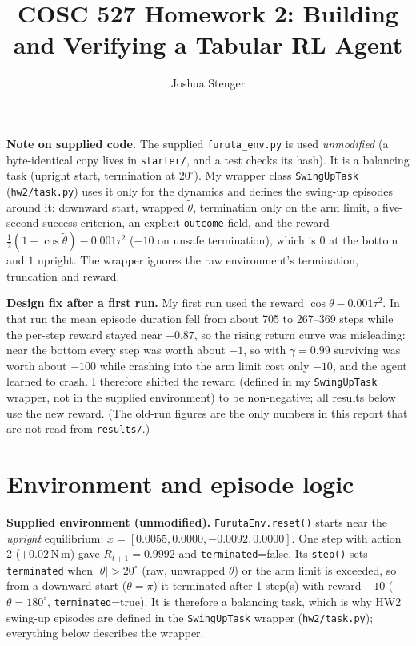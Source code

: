 \documentclass[11pt]{article}
\title{COSC 527 Homework 2: Building and Verifying a Tabular RL Agent}
\author{Joshua Stenger}
\date{}
\newcommand{\cfggamma}{0.99}
\newcommand{\rawinit}{[0.0055, 0.0000, -0.0092, 0.0000]}
\newcommand{\rawR}{0.9992}
\newcommand{\rawTerm}{false}
\newcommand{\rawlimit}{20}
\newcommand{\rawDownSteps}{1}
\newcommand{\rawDownReward}{$-10$}
\newcommand{\rawDownTheta}{180}
\newcommand{\rawDownTerm}{true}
\newcommand{\oldDurFrom}{705}
\newcommand{\oldDurTo}{267--369}
\begin{document}
\maketitle

\noindent\textbf{Note on supplied code.} The supplied \texttt{furuta\_env.py} is used \emph{unmodified} (a byte-identical copy lives in \texttt{starter/}, and a test checks its hash). It is a balancing task (upright start, termination at $20^\circ$). My wrapper class \texttt{SwingUpTask} (\texttt{hw2/task.py}) uses it only for the dynamics and defines the swing-up episodes around it: downward start, wrapped $\widetilde\theta$, termination only on the arm limit, a five-second success criterion, an explicit \texttt{outcome} field, and the reward $\tfrac12(1+\cos\widetilde\theta)-0.001\tau^2$ ($-10$ on unsafe termination), which is $0$ at the bottom and $1$ upright. The wrapper ignores the raw environment's termination, truncation and reward.

\noindent\textbf{Design fix after a first run.} My first run used the reward $\cos\widetilde\theta-0.001\tau^2$. In that run the mean episode duration fell from about \oldDurFrom{} to \oldDurTo{} steps while the per-step reward stayed near $-0.87$, so the rising return curve was misleading: near the bottom every step was worth about $-1$, so with $\gamma=\cfggamma$ surviving was worth about $-100$ while crashing into the arm limit cost only $-10$, and the agent learned to crash. I therefore shifted the reward (defined in my \texttt{SwingUpTask} wrapper, not in the supplied environment) to be non-negative; all results below use the new reward. (The old-run figures are the only numbers in this report that are not read from \texttt{results/}.)

\section{Environment and episode logic}
\textbf{Supplied environment (unmodified).} \texttt{FurutaEnv.reset()} starts near the \emph{upright} equilibrium: $x=\rawinit$. One step with action 2 ($+0.02$\,N\,m) gave $R_{t+1}=\rawR$ and \texttt{terminated}=\rawTerm. Its \texttt{step()} sets \texttt{terminated} when $|\theta|>\rawlimit^\circ$ (raw, unwrapped $\theta$) or the arm limit is exceeded, so from a downward start ($\theta=\pi$) it terminated after \rawDownSteps{} step(s) with reward \rawDownReward{} ($\theta=\rawDownTheta^\circ$, \texttt{terminated}=\rawDownTerm). It is therefore a balancing task, which is why HW2 swing-up episodes are defined in the \texttt{SwingUpTask} wrapper (\texttt{hw2/task.py}); everything below describes the wrapper.
\end{document}
